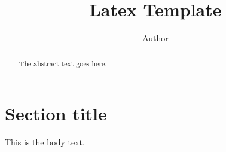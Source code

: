 \documentclass{article}
\begin{document}
\title{Latex Template}
\author{Author}

\maketitle

\begin{abstract}
The abstract text goes here.
\end{abstract}

\section{Section title}
This is the body text.

%
%
\end{document}
